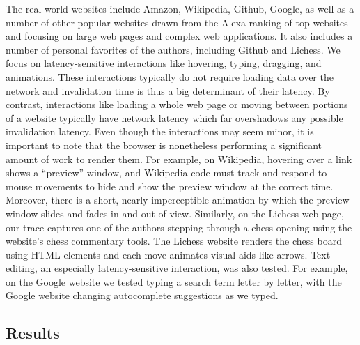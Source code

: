The \NumWebsites real-world websites include
  Amazon, Wikipedia, Github, Google,
  as well as a number of other popular websites
  drawn from the Alexa ranking of top websites
  and focusing on large web pages and complex web applications.
It also includes a number of personal favorites of the authors,
  including Github and Lichess.
We focus on latency-sensitive interactions
  like hovering, typing, dragging, and animations.
These interactions typically
  do not require loading data over the network
  and invalidation time is thus a big determinant of their latency.
By contrast, interactions like loading a whole web page
  or moving between portions of a website
  typically have network latency which far overshadows
  any possible invalidation latency.
Even though the interactions may seem minor,
  it is important to note that the browser is nonetheless
  performing a significant amount of work to render them.
For example, on Wikipedia, hovering over a link
  shows a ``preview'' window,
  and Wikipedia code must track and respond to mouse movements
  to hide and show the preview window at the correct time.
Moreover, there is a short, nearly-imperceptible animation
  by which the preview window slides and fades in and out of view.
Similarly, on the Lichess web page,
  our trace captures one of the authors
  stepping through a chess opening using the website's
  chess commentary tools.
The Lichess website renders the chess board using HTML elements
  and each move animates visual aids like arrows.
Text editing, an especially latency-sensitive interaction,
  was also tested.
For example, on the Google website we tested
  typing a search term letter by letter,
  with the Google website changing autocomplete suggestions
  as we typed.

\subsection{Results}

